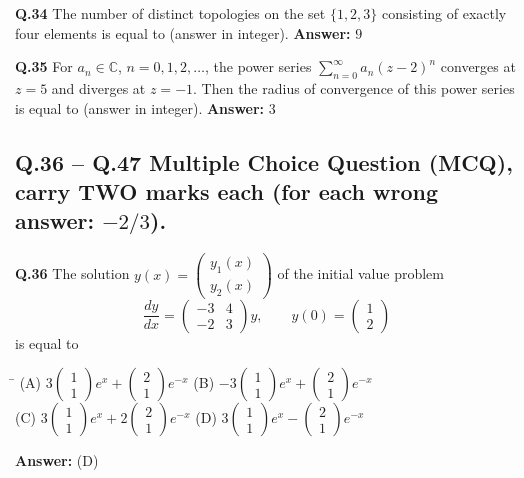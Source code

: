 \documentclass[11pt,a4paper]{article}
\newcommand{\optsfourA}[4]{%
  \begin{tabbing}
    \hspace{0.48\linewidth}\=\kill
    (A) #1 \> (B) #2 \\[2pt]
    (C) #3 \> (D) #4
  \end{tabbing}%
}
\newcommand{\ans}[1]{\textbf{Answer:} #1\par\medskip}
\begin{document}
\textbf{Q.34} The number of distinct topologies on the set $\{1, 2, 3\}$ consisting of exactly four elements is equal to \underline{\hspace{2cm}} (answer in integer).
\ans{$9$}

\textbf{Q.35} For $a_n \in \mathbb{C}$, $n = 0, 1, 2, \ldots$, the power series $\sum_{n=0}^{\infty} a_n (z - 2)^n$ converges at $z = 5$ and diverges at $z = -1$. Then the radius of convergence of this power series is equal to \underline{\hspace{2cm}} (answer in integer).
\ans{$3$}

\subsection*{Q.36 -- Q.47 Multiple Choice Question (MCQ), carry TWO marks each (for each wrong answer: $-2/3$).}

\textbf{Q.36} The solution $y(x) = \begin{pmatrix} y_1(x) \\ y_2(x) \end{pmatrix}$ of the initial value problem
\[
  \frac{dy}{dx} = \begin{pmatrix} -3 & 4 \\ -2 & 3 \end{pmatrix} y, \qquad y(0) = \begin{pmatrix} 1 \\ 2 \end{pmatrix}
\]
is equal to
\optsfourA{$3\begin{pmatrix} 1 \\ 1 \end{pmatrix} e^x + \begin{pmatrix} 2 \\ 1 \end{pmatrix} e^{-x}$}{$-3\begin{pmatrix} 1 \\ 1 \end{pmatrix} e^x + \begin{pmatrix} 2 \\ 1 \end{pmatrix} e^{-x}$}{$3\begin{pmatrix} 1 \\ 1 \end{pmatrix} e^x + 2\begin{pmatrix} 2 \\ 1 \end{pmatrix} e^{-x}$}{$3\begin{pmatrix} 1 \\ 1 \end{pmatrix} e^x - \begin{pmatrix} 2 \\ 1 \end{pmatrix} e^{-x}$}
\ans{(D)}
\end{document}
